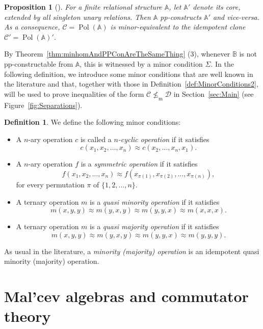\documentclass[12pt]{amsart}
\newtheorem{proposition}[theorem]{Proposition}
\theoremstyle{definition}
\theoremstyle{definition}
\newtheorem{definition}[theorem]{Definition}
\newcommand{\struct}[1]{\mathbb{#1}}
\newcommand{\clo}[1]{\mathcal{#1}}
\DeclareMathOperator{\Pol}{Pol}
\newcommand{\notisaminorof}{\nleq_{\mathrm{m}}}
\begin{document}
\begin{proposition}[\cite{wonderland}]\label{prop:idempotent}
For a finite relational structure $\mathbb A$, let $\mathbb A'$ denote its core, extended by all singleton unary relations. Then $\mathbb A$ pp-constructs $\mathbb A'$ and vice-versa. As a consequence, $\clo{C} = \Pol(\struct{A})$ is minor-equivalent to the idempotent clone $\clo{C}' = \Pol(\struct{A})'$.
\end{proposition}

By Theorem~\ref{thm:minhomAndPPConAreTheSameThing} (3), whenever $\struct{B}$ is not pp-constructable from $\struct{A}$, this is witnessed by a minor condition $\Sigma$. In the following definition, we introduce some minor conditions that are well known in the literature and that, together with those in Definition~\ref{def:MinorConditions2}, will be used to prove inequalities of the form $\clo{C}\notisaminorof\clo{D}$ in Section~\ref{sec:Main} (see Figure~\ref{fig:Separations}).

\begin{definition}\label{def:MinorConditions} 
We define the following minor conditions:
\begin{itemize}
\item A $n$-ary operation $c$ is called a \emph{$n$-cyclic operation} if it satisfies
\[
c(x_1,x_2,\dots,x_n)\approx c(x_2,\dots,x_n,x_1).
\]
\item A $n$-ary operation $f$ is a \emph{symmetric operation} if it satisfies
\[
    f(x_1, x_2,\dots, x_n) \approx f(x_{\pi(1)}, x_{\pi(2)},\dots,x_{\pi(n)}),
\]
for every permutation $\pi$ of $\{1,2,\dots,n\}$.
\item A ternary operation $m$ is a \emph{quasi minority operation} if it satisfies
\[
m(x,y,y)\approx m(y,x,y)\approx m(y,y,x)\approx m(x,x,x).
\]
\item A ternary operation $m$ is a \emph{quasi majority operation} if it satisfies
\[
m(x,y,y)\approx m(y,x,y)\approx m(y,y,x)\approx m(y,y,y).
\]
\end{itemize}
As usual in the literature, a \emph{minority (majority) operation} is an idempotent quasi minority (majority) operation.
\end{definition}



\section{Mal'cev algebras and commutator theory} \label{sec:malcev}
\end{document}
